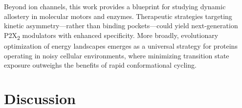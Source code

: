 \documentclass[pdflatex,sn-mathphys-num]{sn-jnl}%
\theoremstyle{thmstyleone}%
\theoremstyle{thmstyletwo}%
\theoremstyle{thmstylethree}%
\begin{document}
Beyond ion channels, this work provides a blueprint for studying dynamic allostery in molecular motors and enzymes. Therapeutic strategies targeting kinetic asymmetry—rather than binding pockets—could yield next-generation P2X\textsubscript{2} modulators with enhanced specificity. More broadly, evolutionary optimization of energy landscapes emerges as a universal strategy for proteins operating in noisy cellular environments, where minimizing transition state exposure outweighs the benefits of rapid conformational cycling.

\section{Discussion}

\end{document}
